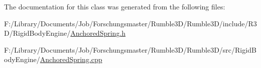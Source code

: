 The documentation for this class was generated from the following files\+:\begin{DoxyCompactItemize}
\item 
F\+:/\+Library/\+Documents/\+Job/\+Forschungsmaster/\+Rumble3\+D/\+Rumble3\+D/include/\+R3\+D/\+Rigid\+Body\+Engine/\hyperlink{_anchored_spring_8h}{Anchored\+Spring.\+h}\item 
F\+:/\+Library/\+Documents/\+Job/\+Forschungsmaster/\+Rumble3\+D/\+Rumble3\+D/src/\+Rigid\+Body\+Engine/\hyperlink{_anchored_spring_8cpp}{Anchored\+Spring.\+cpp}\end{DoxyCompactItemize}
